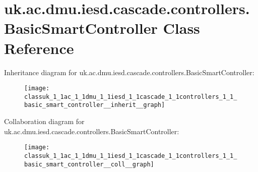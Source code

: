\hypertarget{classuk_1_1ac_1_1dmu_1_1iesd_1_1cascade_1_1controllers_1_1_basic_smart_controller}{\section{uk.\-ac.\-dmu.\-iesd.\-cascade.\-controllers.\-Basic\-Smart\-Controller Class Reference}
\label{classuk_1_1ac_1_1dmu_1_1iesd_1_1cascade_1_1controllers_1_1_basic_smart_controller}
}


Inheritance diagram for uk.\-ac.\-dmu.\-iesd.\-cascade.\-controllers.\-Basic\-Smart\-Controller\-:\nopagebreak
\begin{figure}[H]
\begin{center}
\leavevmode
\texttt{[image: classuk\_1\_1ac\_1\_1dmu\_1\_1iesd\_1\_1cascade\_1\_1controllers\_1\_1\_basic\_smart\_controller\_\_inherit\_\_graph]}
\end{center}
\end{figure}


Collaboration diagram for uk.\-ac.\-dmu.\-iesd.\-cascade.\-controllers.\-Basic\-Smart\-Controller\-:\nopagebreak
\begin{figure}[H]
\begin{center}
\leavevmode
\texttt{[image: classuk\_1\_1ac\_1\_1dmu\_1\_1iesd\_1\_1cascade\_1\_1controllers\_1\_1\_basic\_smart\_controller\_\_coll\_\_graph]}
\end{center}
\end{figure}
